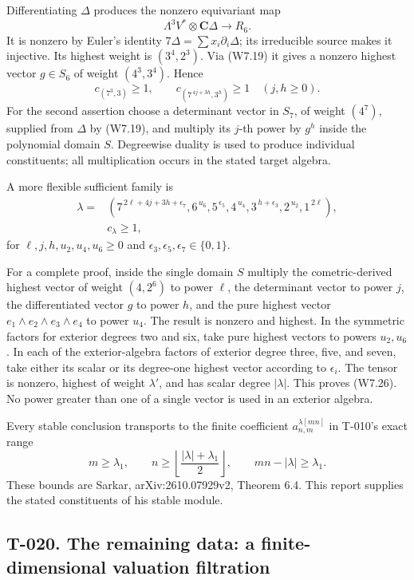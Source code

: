 \documentclass[
  10pt,
]{article}
\begin{document}
Differentiating \(\Delta\) produces the nonzero equivariant map \[
\Lambda^3V^*\otimes\mathbf C\Delta\longrightarrow R_6.
\tag{W7.24}
\] It is nonzero by Euler's identity
\(7\Delta=\sum x_i\partial_i\Delta\); its irreducible source makes it
injective. Its highest weight is \((3^4,2^3)\). Via (W7.19) it gives a
nonzero highest vector \(g\in S_6\) of weight \((4^3,3^4)\). Hence \[
c_{(7^3,3)}\ge1,\qquad
c_{(7^{\,4j+3h},3^h)}\ge1\quad(j,h\ge0).
\tag{W7.25}
\] For the second assertion choose a determinant vector in \(S_7\), of
weight \((4^7)\), supplied from \(\Delta\) by (W7.19), and multiply its
\(j\)-th power by \(g^h\) inside the polynomial domain \(S\). Degreewise
duality is used to produce individual constituents; all multiplication
occurs in the stated target algebra.

A more flexible sufficient family is \[
\boxed{\begin{split}
\lambda={}&(7^{\,2\ell+4j+3h+\epsilon_7},
6^{\,u_6},5^{\,\epsilon_5},4^{\,u_4},
3^{\,h+\epsilon_3},2^{\,u_2},1^{\,2\ell}),\\
&c_\lambda\ge1,
\end{split}}
\tag{W7.26}
\] for \(\ell,j,h,u_2,u_4,u_6\ge0\) and
\(\epsilon_3,\epsilon_5,\epsilon_7\in\{0,1\}\).

For a complete proof, inside the single domain \(S\) multiply the
cometric-derived highest vector of weight \((4,2^6)\) to power \(\ell\),
the determinant vector to power \(j\), the differentiated vector \(g\)
to power \(h\), and the pure highest vector
\(e_1\wedge e_2\wedge e_3\wedge e_4\) to power \(u_4\). The result is
nonzero and highest. In the symmetric factors for exterior degrees two
and six, take pure highest vectors to powers \(u_2,u_6\). In each of the
exterior-algebra factors of exterior degree three, five, and seven, take
either its scalar or its degree-one highest vector according to
\(\epsilon_i\). The tensor is nonzero, highest of weight \(\lambda'\),
and has scalar degree \(|\lambda|\). This proves (W7.26). No power
greater than one of a single vector is used in an exterior algebra.

Every stable conclusion transports to the finite coefficient
\(a_{n,m}^{\lambda[mn]}\) in T-010's exact range \[
m\ge\lambda_1,\qquad
n\ge\left\lfloor\frac{|\lambda|+\lambda_1}{2}\right\rfloor,
\qquad mn-|\lambda|\ge\lambda_1.
\] These bounds are Sarkar, arXiv:2610.07929v2, Theorem 6.4. This report
supplies the stated constituents of his stable module.

\subsection{T-020. The remaining data: a finite-dimensional valuation
filtration}\label{t-020.-the-remaining-data-a-finite-dimensional-valuation-filtration}
\end{document}
